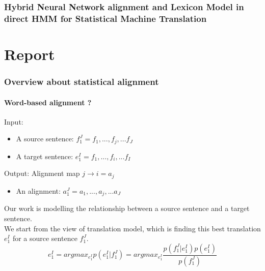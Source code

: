 \documentclass{article}
\begin{document}
\section{Hybrid Neural Network alignment and Lexicon Model in direct HMM for Statistical Machine Translation}




\pagebreak 
\part{Report}

\section{Overview about statistical alignment }

\subsection{Word-based alignment ? \cite{Och2003Systematic}}
Input:
\begin{itemize}
\item A source sentence: $f_1^J = f_1,...,f_j,...f_J$
\item A target sentence: $e_1^I = f_1,...,f_i,...f_I$
\end{itemize}
Output: Alignment map $j \rightarrow i = a_j$
\begin{itemize}
\item An alignment: $a_1^J = a_1,...,a_j,...a_J$
\end{itemize}


Our work is modelling the relationship between a source sentence and a target sentence. \\
We start from the view of translation model, which is finding this best translation $e_1^I$ for a source sentence $f_1^J$.
\begin{equation}
e_1^I = argmax_{e_1^I} p(e_1^I|f_1^J) = argmax_{e_1^I} \frac{p(f_1^J|e_1^I)p(e_1^I)}{p(f_1^J)}
\end{equation}
\end{document}
